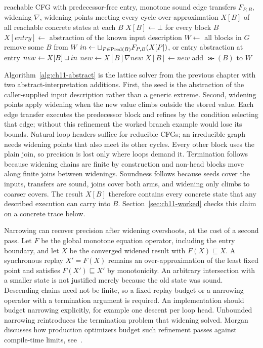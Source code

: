 \begin{algorithm}
\caption{Abstract interpretation over a CFG with widening at loop heads}\label{alg:ch11-abstract}
\begin{pseudocode}
\Require reachable CFG with predecessor-free entry, monotone sound edge transfers $F_{P,B}$, widening $\nabla$, widening points meeting every cycle
\Ensure over-approximation $X[B]$ of all reachable concrete states at each $B$
\State $X[B] \gets \bot$ for every block $B$
\State $X[entry] \gets$ abstraction of the known input description
\State $W \gets$ all blocks in $G$
\State remove some $B$ from $W$
\State $in \gets \sqcup_{P \in \operatorname{Pred}(B)} F_{P,B}(X[P])$, or entry abstraction at entry
\State $new \gets X[B] \sqcup in$
\State $new \gets X[B] \nabla new$
\EndIf
{}
\State $X[B] \gets new$
\State add $\Succ(B)$ to $W$
\EndIf
\EndWhile
\end{pseudocode}
\end{algorithm}

Algorithm~\ref{alg:ch11-abstract} is the lattice solver from the previous chapter with two abstract-interpretation additions.
First, the seed is the abstraction of the caller-supplied input description rather than a generic extreme.
Second, widening points apply widening when the new value climbs outside the stored value.
Each edge transfer executes the predecessor block and refines by the condition selecting that edge; without this refinement the worked branch example would lose its bounds.
Natural-loop headers suffice for reducible CFGs; an irreducible graph needs widening points that also meet its other cycles.
Every other block uses the plain join, so precision is lost only where loops demand it.
Termination follows because widening chains are finite by construction and non-head blocks move along finite joins between widenings.
Soundness follows because seeds cover the inputs, transfers are sound, joins cover both arms, and widening only climbs to coarser covers.
The result $X[B]$ therefore contains every concrete state that any described execution can carry into $B$.
Section~\ref{sec:ch11-worked} checks this claim on a concrete trace below.

Narrowing can recover precision after widening overshoots, at the cost of a second pass.
Let $F$ be the global monotone equation operator, including the entry boundary, and let $X$ be the converged widened result with $F(X)\sqsubseteq X$.
A synchronous replay $X'=F(X)$ remains an over-approximation of the least fixed point and satisfies $F(X')\sqsubseteq X'$ by monotonicity.
An arbitrary intersection with a smaller state is not justified merely because the old state was sound.
Descending chains need not be finite, so a fixed replay budget or a narrowing operator with a termination argument is required.
An implementation should budget narrowing explicitly, for example one descent per loop head.
Unbounded narrowing reintroduces the termination problem that widening solved.
Morgan discusses how production optimizers budget such refinement passes against compile-time limits, see~\cite{morgan-1998-optimizing}.
